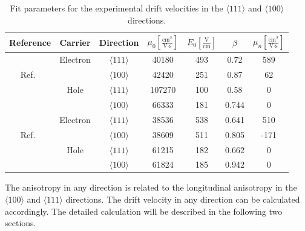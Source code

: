 \begin{table}[tbhp]
  \centering
  \begin{tabular}{ccccccc}\hline\hline
     Reference & Carrier & Direction & $\mu_{0} \left[ \frac{\mbox{cm}^{2}}{\mbox{V}\cdot\mbox{s}} \right]$ & $E_{0} \left[ \frac{\mbox{V}}{\mbox{cm}} \right]$ & $\beta$ & $\mu_{n} \left[ \frac{\mbox{cm}^{2}}{\mbox{V}\cdot\mbox{s}} \right]$ \\\hline
& Electron & $\langle111\rangle$ & 40180 & 493 & 0.72 & 589 \\
Ref.~\cite{miha}& & $\langle100\rangle$ & 42420 & 251 & 0.87 & 62\\
& Hole & $\langle111\rangle$ & 107270 & 100 & 0.58 & 0 \\
& & $\langle100\rangle$ & 66333 & 181 & 0.744 & 0 \\\hline\hline
& Electron & $\langle111\rangle$ & 38536 & 538 & 0.641 & 510 \\
Ref.~\cite{bart}& & $\langle100\rangle$ & 38609 & 511 & 0.805 & -171\\ 
& Hole & $\langle111\rangle$ & 61215 & 182 & 0.662 & 0 \\
& & $\langle100\rangle$ & 61824 & 185 & 0.942 & 0 \\\hline\hline
  \end{tabular}
  \caption{Fit parameters for the experimental drift velocities in the 
$\langle111\rangle$ and $\langle100\rangle$ directions.}
\label{tab:pars}
\end{table}

The anisotropy in any direction is related to the longitudinal anisotropy in the $\langle100\rangle$ and $\langle111\rangle$ directions. The drift velocity in any direction can be calculated accordingly. The detailed calculation will be described in the following two sections.

